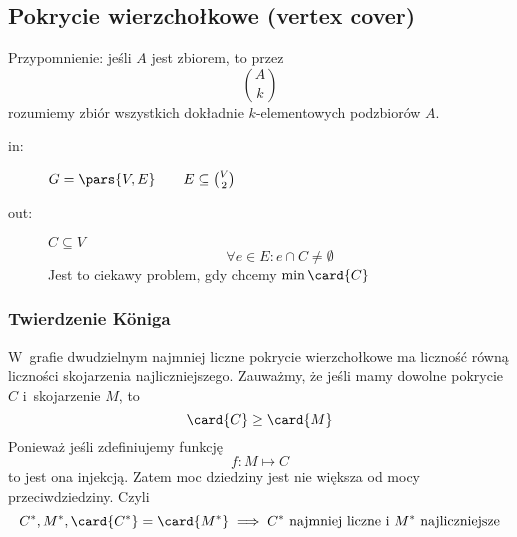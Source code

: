 \subsection*{Pokrycie wierzchołkowe (vertex cover)}
Przypomnienie: jeśli \(A\) jest zbiorem, to przez
\begin{equation*}
    \binom{A}{k}
\end{equation*}
rozumiemy zbiór wszystkich dokładnie \(k\)-elementowych podzbiorów \(A\).
\begin{description}
    \item[in:] \(G = \pars{V, E} \qquad E \subseteq \binom{V}{2}\)
    \item[out:] \(C \subseteq V\)
        \begin{equation*}
            \forall e \in E\colon e \cap C \neq \emptyset
        \end{equation*}
        Jest to ciekawy problem, gdy chcemy \(\min\card{C}\)
\end{description}
\subsubsection*{Twierdzenie Königa}
W~grafie dwudzielnym najmniej liczne pokrycie wierzchołkowe ma liczność równą liczności skojarzenia najliczniejszego. Zauważmy, że jeśli mamy dowolne pokrycie \(C\) i~skojarzenie \(M\), to
\begin{equation*}
    \card{C} \geq \card{M}
\end{equation*}
Ponieważ jeśli zdefiniujemy funkcję
\begin{equation*}
    f\colon M \mapsto C
\end{equation*}
to jest ona injekcją. Zatem moc dziedziny jest nie większa od mocy przeciwdziedziny. Czyli
\begin{equation*}
    C^*, M^*, \card{C^*} = \card{M^*} \implies C^* \text{ najmniej liczne i~} M^* \text{ najliczniejsze}
\end{equation*}
